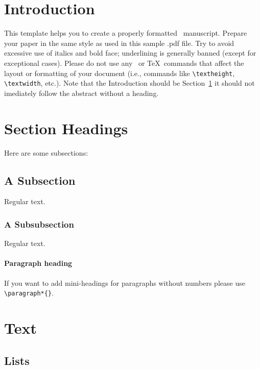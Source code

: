 \documentclass[ecta,nameyear,draft]{econsocart}
\theoremstyle{plain}
\theoremstyle{definition}
\begin{document}
\section{Introduction}\label{s1}

This template helps you to create a properly formatted \LaTeXe\ manuscript.
Prepare your paper in the same style as used in this sample .pdf file.
Try to avoid excessive use of italics and bold face; underlining is generally banned (except for exceptional cases). Please do not use any \LaTeXe\ or \TeX\ commands that affect the layout or formatting of your document (i.e., commands like \verb|\textheight|, \verb|\textwidth|, etc.). Note that the Introduction should be Section~\ref{s1} it should not imediately follow the abstract without a heading.

\section{Section Headings}
Here are some subsections:
\subsection{A Subsection}
Regular text.
\subsubsection{A Subsubsection}
Regular text.

\paragraph*{Paragraph heading} If you want to add mini-headings for paragraphs without numbers please use \verb|\paragraph*{}|.

\section{Text}

\subsection{Lists}
\end{document}

